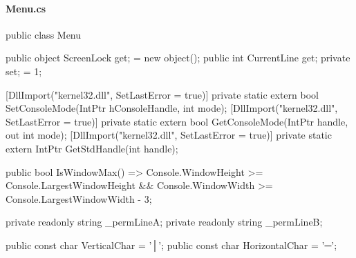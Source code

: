 \begin{flushleft}
    
    \paragraph{Menu.cs}    
    \begin{cscode}
public class Menu
{
    public object ScreenLock { get; } = new object();
    public int CurrentLine { get; private set; } = 1;

    [DllImport("kernel32.dll", SetLastError = true)]
    private static extern bool SetConsoleMode(IntPtr hConsoleHandle, int mode);
    [DllImport("kernel32.dll", SetLastError = true)]
    private static extern bool GetConsoleMode(IntPtr handle, out int mode);
    [DllImport("kernel32.dll", SetLastError = true)]
    private static extern IntPtr GetStdHandle(int handle);

    public bool IsWindowMax() => Console.WindowHeight >= Console.LargestWindowHeight && Console.WindowWidth >= Console.LargestWindowWidth - 3;

    private readonly string _permLineA;
    private readonly string _permLineB;

    public const char VerticalChar = '│';
    public const char HorizontalChar = '─';

}
\end{cscode}
\end{flushleft}
